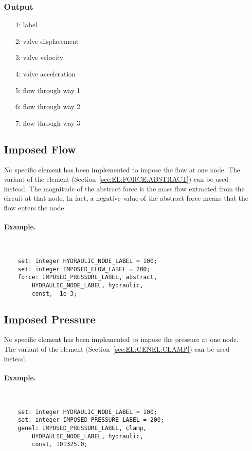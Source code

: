 \subsubsection{Output}
\begin{itemize}
\item[1:] label
\item[2:] valve displacement
\item[3:] valve velocity
\item[4:] valve acceleration
\item[5:] flow through way 1
\item[6:] flow through way 2
\item[7:] flow through way 3
\end{itemize}


\subsection{Imposed Flow}
\label{sec:EL:HYDR:IMPOSED_FLOW}
No specific element has been implemented to impose the flow at one node.
The  variant of the  element
(Section~\ref{sec:EL:FORCE:ABSTRACT}) can be used instead.
The magnitude of the abstract force is the mass flow extracted
from the circuit at that node.
In fact, a negative value of the abstract force means that the flow enters
the node.

\paragraph{Example.} \
\begin{verbatim}
    set: integer HYDRAULIC_NODE_LABEL = 100;
    set: integer IMPOSED_FLOW_LABEL = 200;
    force: IMPOSED_PRESSURE_LABEL, abstract,
        HYDRAULIC_NODE_LABEL, hydraulic,
        const, -1e-3;
\end{verbatim}



\subsection{Imposed Pressure}
\label{sec:EL:HYDR:IMPOSED_PRESSURE}
No specific element has been implemented to impose the pressure at one node.
The \kw{clamp} variant of the \kw{genel} element
(Section~\ref{sec:EL:GENEL:CLAMP}) can be used instead.

\paragraph{Example.} \
\begin{verbatim}
    set: integer HYDRAULIC_NODE_LABEL = 100;
    set: integer IMPOSED_PRESSURE_LABEL = 200;
    genel: IMPOSED_PRESSURE_LABEL, clamp,
        HYDRAULIC_NODE_LABEL, hydraulic,
        const, 101325.0;
\end{verbatim}





